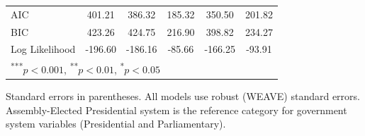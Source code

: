 \documentclass[a4paper]{article}\usepackage{graphicx, color}
\begin{document}
\begin{table}
\begin{center}
\begin{tabular}{l c c c c c }
\hline
AIC                  & 401.21        & 386.32        & 185.32        & 350.50       & 201.82        \\
BIC                  & 423.26        & 424.75        & 216.90        & 398.82       & 234.27        \\
Log Likelihood       & -196.60       & -186.16       & -85.66        & -166.25      & -93.91        \\
\hline
\multicolumn{6}{l}{\scriptsize{\textsuperscript{***}$p<0.001$, 
  \textsuperscript{**}$p<0.01$, 
  \textsuperscript{*}$p<0.05$}}
\end{tabular}


\end{center}
{\scriptsize{
    Standard errors in parentheses. All models use robust (WEAVE) standard errors. \\
    Assembly-Elected Presidential system is the reference category for government system variables (Presidential and Parliamentary). \\
}}
\end{table}
\end{document}
